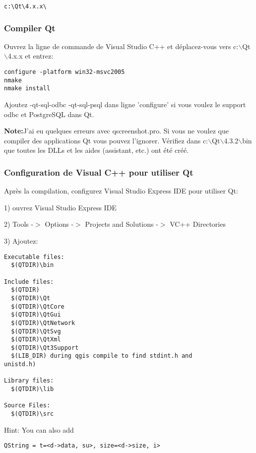 \begin{verbatim}
c:\Qt\4.x.x\
\end{verbatim}

\subsubsection{Compiler Qt}
Ouvrez la ligne de commande de Visual Studio C++ et d\'eplacez-vous vers c:$\backslash$Qt$\backslash$4.x.x et entrez:

\begin{verbatim}
configure -platform win32-msvc2005
nmake
nmake install
\end{verbatim}

Ajoutez -qt-sql-odbc -qt-sql-psql dans ligne  'configure' si vous voulez le support odbc et PostgreSQL dans Qt.

\textbf{Note:}J'ai eu quelques erreurs avec qscreenshot.pro. Si vous ne voulez que compiler des applications Qt vous pouvez l'ignorer. V\'erifiez dans c:$\backslash$Qt$\backslash$4.3.2$\backslash$bin que toutes les DLLs et les aides (assistant, etc.) ont \'et\'e cr\'e\'e.

\subsubsection{Configuration de Visual C++ pour utiliser Qt}
Apr\`es la compilation, configurez Visual Studio Express IDE pour utiliser Qt:

1) ouvrez Visual Studio Express IDE

2) Tools -$>$ Options -$>$ Projects and Solutions -$>$ VC++ Directories

3) Ajoutez:

\begin{verbatim}
Executable files: 
  $(QTDIR)\bin

Include files: 
  $(QTDIR)
  $(QTDIR)\Qt
  $(QTDIR)\QtCore
  $(QTDIR)\QtGui
  $(QTDIR)\QtNetwork
  $(QTDIR)\QtSvg
  $(QTDIR)\QtXml
  $(QTDIR)\Qt3Support
  $(LIB_DIR) during qgis compile to find stdint.h and
unistd.h)

Library files: 
  $(QTDIR)\lib

Source Files:
  $(QTDIR)\src
\end{verbatim}

Hint:  You can also add

\begin{verbatim}
QString = t=<d->data, su>, size=<d->size, i>
\end{verbatim}

